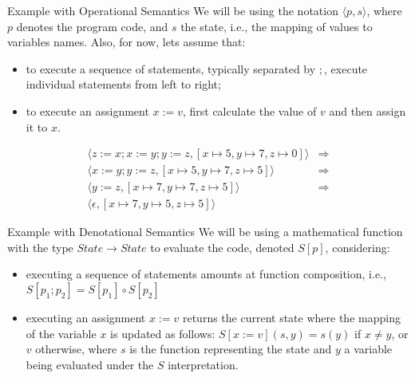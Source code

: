 \documentclass[aspectratio=169]{beamer}
\begin{document}
\begin{slide}{Example with Operational Semantics}
We will be using the notation $\langle p,s \rangle$, where $p$ denotes the program code, and $s$ the state, i.e., the mapping of values to variables names. Also, for now, lets assume that:
\begin{itemize}
\item to execute a sequence of statements, typically separated by $;$, execute individual statements from left to right; 
\item to execute an assignment $x := v$, first calculate the value of $v$ and then assign it to $x$.
\end{itemize}
\begin{align*}
  \langle z:= x; x:= y; y := z, [x \mapsto 5,y \mapsto 7,z \mapsto 0]\rangle  & \Rightarrow \\
  \langle x:= y; y := z, [x \mapsto 5,y \mapsto 7,z \mapsto 5]\rangle  & \Rightarrow \\
  \langle y := z, [x \mapsto 7,y \mapsto 7,z \mapsto 5]\rangle  & \Rightarrow \\
  \langle \epsilon, [x \mapsto 7,y \mapsto 5,z \mapsto 5]\rangle
\end{align*}
\end{slide}

\begin{slide}{Example with Denotational Semantics}
 We will be using a mathematical function with the type $State \to State$ to evaluate the code, denoted $S[p]$, considering:
\begin{itemize}
\item executing a sequence of statements amounts at function composition, i.e., $S[p_1;p_2] = S[p_1] \circ S[p_2]$
\item executing an assignment $x := v$ returns the current state where the mapping of the variable $x$ is updated as follows: $S[x:=v](s,y) = s(y)$ if $x \not= y$, or $v$ otherwise, where $s$ is the function representing the state and $y$ a variable being evaluated under the $S$ interpretation.
\end{itemize}
\end{slide}
\end{document}
